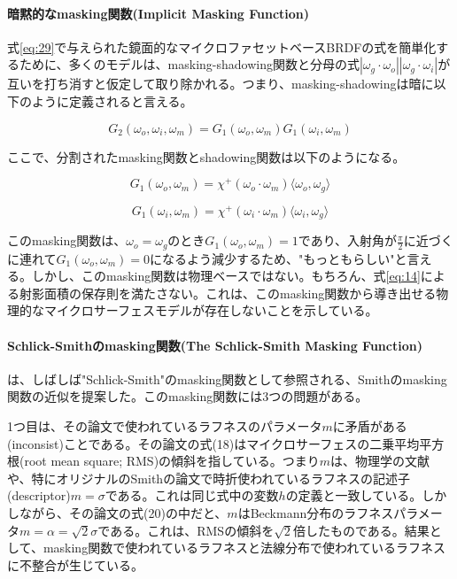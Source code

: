 \documentclass[a4j,xelatex,ja=standard]{bxjsarticle}
\begin{document}
\paragraph{暗黙的なmasking関数(Implicit Masking Function)}

式\eqref{eq:29}で与えられた鏡面的なマイクロファセットベースBRDFの式を簡単化するために、多くのモデルは、masking-shadowing関数と分母の式$|\omega_g \cdot \omega_o| |\omega_g \cdot \omega_i|$が互いを打ち消すと仮定して取り除かれる\cite{McAuley2013}。つまり、masking-shadowingは暗に以下のように定義されると言える。

\begin{equation}
    G_2(\omega_o, \omega_i, \omega_m) = G_1(\omega_o, \omega_m) G_1(\omega_i, \omega_m)
    \label{eq:55}
\end{equation}

ここで、分割されたmasking関数とshadowing関数は以下のようになる。

\begin{equation}
    G_1(\omega_o, \omega_m) = \chi^+(\omega_o \cdot \omega_m) \langle \omega_o, \omega_g \rangle
    \label{eq:56}
\end{equation}

\begin{equation}
    G_1(\omega_i, \omega_m) = \chi^+(\omega_i \cdot \omega_m) \langle \omega_i, \omega_g \rangle
    \label{eq:57}
\end{equation}

このmasking関数は、$\omega_o = \omega_g$のとき$G_1(\omega_o, \omega_m) = 1$であり、入射角が$\frac{\pi}{2}$に近づくに連れて$G_1(\omega_o, \omega_m) = 0$になるよう減少するため、"もっともらしい"と言える。しかし、このmasking関数は物理ベースではない。もちろん、式\eqref{eq:14}による射影面積の保存則を満たさない。これは、このmasking関数から導き出せる物理的なマイクロサーフェスモデルが存在しないことを示している。

\paragraph{Schlick-Smithのmasking関数(The Schlick-Smith Masking Function)}

\citeauthor{Schlick1994} \cite{Schlick1994}は、しばしば"Schlick-Smith"のmasking関数として参照される、Smithのmasking関数の近似を提案した。このmasking関数には3つの問題がある。

1つ目は、その論文で使われているラフネスのパラメータ$m$に矛盾がある(inconsist)ことである。その論文の式(18)はマイクロサーフェスの二乗平均平方根(root mean square; RMS)の傾斜を指している。つまり$m$は、物理学の文献や、特にオリジナルのSmithの論文\cite{Smith1967}で時折使われているラフネスの記述子(descriptor)$m = \sigma$である。これは同じ式中の変数$h$の定義と一致している。しかしながら、その論文の式(20)の中だと、$m$はBeckmann分布のラフネスパラメータ$m = \alpha = \sqrt{2} \sigma$である。これは、RMSの傾斜を$\sqrt{2}$倍したものである。結果として、masking関数で使われているラフネスと法線分布で使われているラフネスに不整合が生じている。
\end{document}
